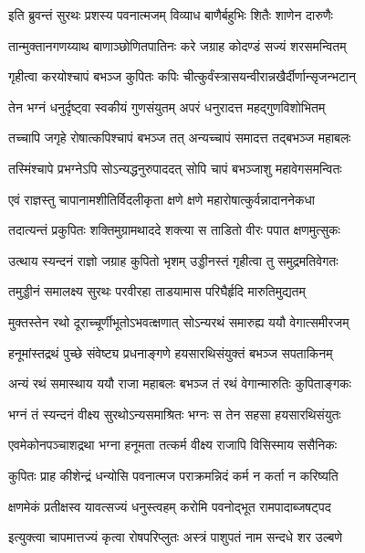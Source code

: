 
\twolineshloka
{इति ब्रुवन्तं सुरथः प्रशस्य पवनात्मजम्}
{विव्याध बाणैर्बहुभिः शितैः शाणेन दारुणैः}%

\twolineshloka
{तान्मुक्तानगणय्याथ बाणाञ्छोणितपातिनः}
{करे जग्राह कोदण्डं सज्यं शरसमन्वितम्}%

\twolineshloka
{गृहीत्वा करयोश्चापं बभञ्ज कुपितः कपिः}
{चीत्कुर्वंस्त्रासयन्वीरान्नखैर्दीर्णान्सृजन्भटान्}%

\twolineshloka
{तेन भग्नं धनुर्दृष्ट्वा स्वकीयं गुणसंयुतम्}
{अपरं धनुरादत्त महद्गुणविशोभितम्}%

\twolineshloka
{तच्चापि जगृहे रोषात्कपिश्चापं बभञ्ज तत्}
{अन्यच्चापं समादत्त तद्बभञ्ज महाबलः}%

\twolineshloka
{तस्मिंश्चापे प्रभग्नेऽपि सोऽन्यद्धनुरुपाददत्}
{सोपि चापं बभञ्जाशु महावेगसमन्वितः}%

\twolineshloka
{एवं राज्ञस्तु चापानामशीतिर्विदलीकृता}
{क्षणे क्षणे महारोषात्कुर्वन्नादाननेकधा}%

\twolineshloka
{तदात्यन्तं प्रकुपितः शक्तिमुग्रामथाददे}
{शक्त्या स ताडितो वीरः पपात क्षणमुत्सुकः}%

\twolineshloka
{उत्थाय स्यन्दनं राज्ञो जग्राह कुपितो भृशम्}
{उड्डीनस्तं गृहीत्वा तु समुद्रमतिवेगतः}%

\twolineshloka
{तमुड्डीनं समालक्ष्य सुरथः परवीरहा}
{ताडयामास परिघैर्हृदि मारुतिमुद्यतम्}%

\twolineshloka
{मुक्तस्तेन रथो दूराच्चूर्णीभूतोऽभवत्क्षणात्}
{सोऽन्यरथं समारुह्य ययौ वेगात्समीरजम्}%

\twolineshloka
{हनूमांस्तद्रथं पुच्छे संवेष्ट्य प्रधनाङ्गणे}
{हयसारथिसंयुक्तं बभञ्ज सपताकिनम्}%

\twolineshloka
{अन्यं रथं समास्थाय ययौ राजा महाबलः}
{बभञ्ज तं रथं वेगान्मारुतिः कुपिताङ्गकः}%

\twolineshloka
{भग्नं तं स्यन्दनं वीक्ष्य सुरथोऽन्यसमाश्रितः}
{भग्नः स तेन सहसा हयसारथिसंयुतः}%

\twolineshloka
{एवमेकोनपञ्चाशद्रथा भग्ना हनूमता}
{तत्कर्म वीक्ष्य राजापि विसिस्माय ससैनिकः}%

\twolineshloka
{कुपितः प्राह कीशेन्द्रं धन्योसि पवनात्मज}
{पराक्रमन्निदं कर्म न कर्ता न करिष्यति}%

\twolineshloka
{क्षणमेकं प्रतीक्षस्व यावत्सज्यं धनुस्त्वहम्}
{करोमि पवनोद्भूत रामपादाब्जषट्पद}%

\twolineshloka
{इत्युक्त्वा चापमात्तज्यं कृत्वा रोषपरिप्लुतः}
{अस्त्रं पाशुपतं नाम सन्दधे शर उल्बणे}%

